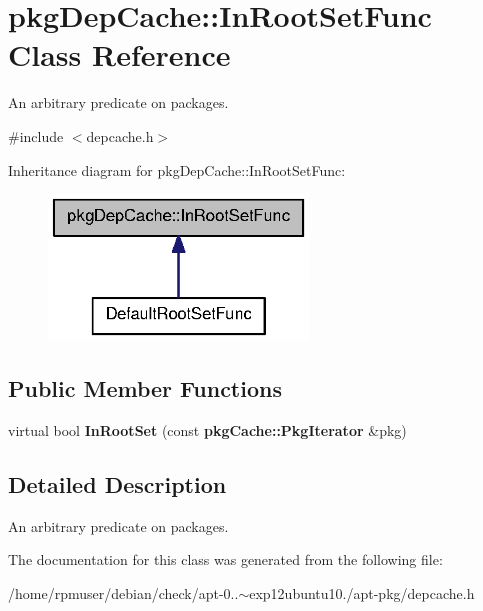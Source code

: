 \section{pkg\-Dep\-Cache\-:\-:\-In\-Root\-Set\-Func \-Class \-Reference}
\label{classpkgDepCache_1_1InRootSetFunc}


\-An arbitrary predicate on packages.  




{\ttfamily \#include $<$depcache.\-h$>$}



\-Inheritance diagram for pkg\-Dep\-Cache\-:\-:\-In\-Root\-Set\-Func\-:
\nopagebreak
\begin{figure}[H]
\begin{center}
\leavevmode
\includegraphics[width=196pt]{classpkgDepCache_1_1InRootSetFunc__inherit__graph}
\end{center}
\end{figure}
\subsection*{\-Public \-Member \-Functions}
\begin{DoxyCompactItemize}
\item 
virtual bool {\bfseries \-In\-Root\-Set} (const {\bf pkg\-Cache\-::\-Pkg\-Iterator} \&pkg)\label{classpkgDepCache_1_1InRootSetFunc_afe41df513f963761eda1f8e217198107}

\end{DoxyCompactItemize}


\subsection{\-Detailed \-Description}
\-An arbitrary predicate on packages. 

\-The documentation for this class was generated from the following file\-:\begin{DoxyCompactItemize}
\item 
/home/rpmuser/debian/check/apt-\/0..$\sim$exp12ubuntu10./apt-\/pkg/depcache.\-h\end{DoxyCompactItemize}
